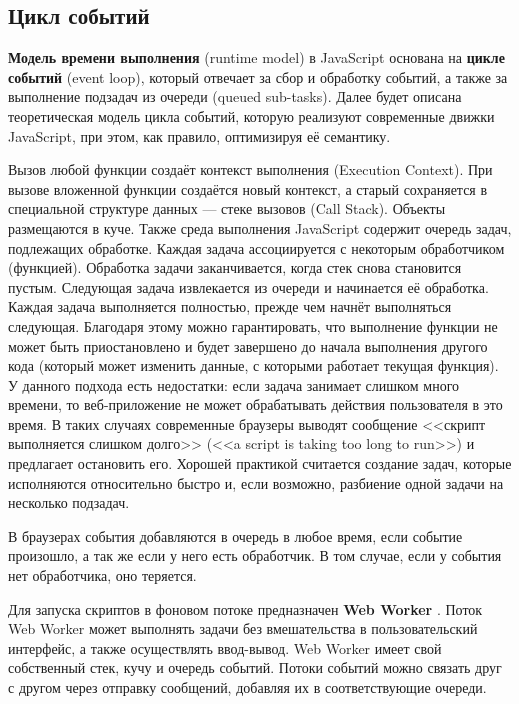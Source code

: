 \subsection{Цикл событий}

\textbf{Модель времени выполнения} (runtime model) в JavaScript основана на \textbf{цикле событий} (event loop), который отвечает за сбор и обработку событий, а также за выполнение подзадач из очереди (queued sub-tasks). Далее будет описана теоретическая модель цикла событий, которую реализуют современные движки JavaScript, при этом, как правило, оптимизируя её семантику. \cite{js_event_loop}

Вызов любой функции создаёт контекст выполнения (Execution Context). При вызове вложенной функции создаётся новый контекст, а старый сохраняется в специальной структуре данных --- стеке вызовов (Call Stack). Объекты размещаются в куче. Также среда выполнения JavaScript содержит очередь задач, подлежащих обработке. Каждая задача ассоциируется с некоторым обработчиком (функцией). Обработка задачи заканчивается, когда стек снова становится пустым. Следующая задача извлекается из очереди и начинается её обработка. Каждая задача выполняется полностью, прежде чем начнёт выполняться следующая. Благодаря этому можно гарантировать, что выполнение функции не может быть приостановлено и будет завершено до начала выполнения другого кода (который может изменить данные, с которыми работает текущая функция). У данного подхода есть недостатки: если задача занимает слишком много времени, то веб-приложение не может обрабатывать действия пользователя в это время. В таких случаях современные браузеры выводят сообщение <<скрипт выполняется слишком долго>> (<<a script is taking too long to run>>) и предлагает остановить его. Хорошей практикой считается создание задач, которые исполняются относительно быстро и, если возможно, разбиение одной задачи на несколько подзадач. \cite{js_event_loop}

В браузерах события добавляются в очередь в любое время, если событие произошло, а так же если у него есть обработчик. В том случае, если у события нет обработчика, оно теряется. \cite{js_event_loop}

Для запуска скриптов в фоновом потоке предназначен \textbf{Web Worker} \cite{js_web_workers}. Поток Web Worker может выполнять задачи без вмешательства в пользовательский интерфейс, а также осуществлять ввод-вывод. Web Worker имеет свой собственный стек, кучу и очередь событий. Потоки событий можно связать друг с другом через отправку сообщений, добавляя их в соответствующие очереди.~\cite{js_event_loop}


